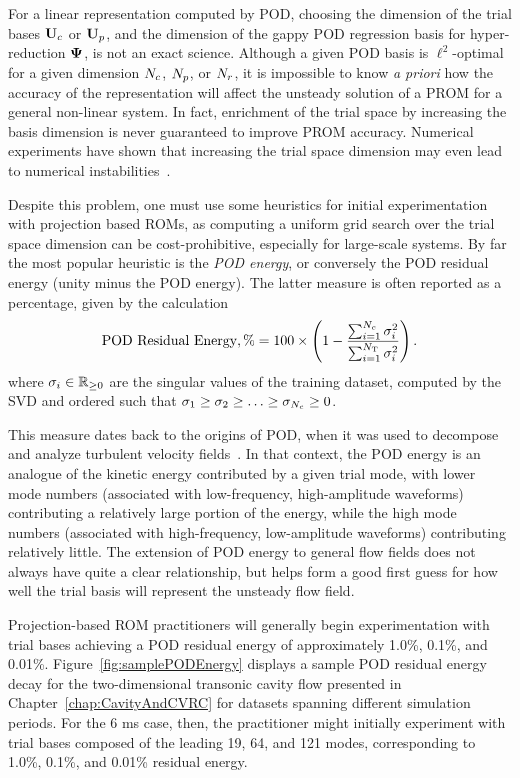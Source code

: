 For a linear representation computed by POD, choosing the dimension of the trial bases $\consTrial$ or $\primTrial$, and the dimension of the gappy POD regression basis for hyper-reduction $\deimBasis$, is not an exact science. Although a given POD basis is $\ell^2$-optimal for a given dimension $N_c$, $N_p$, or $N_r$, it is impossible to know \textit{a priori} how the accuracy of the representation will affect the unsteady solution of a PROM for a general non-linear system. In fact, enrichment of the trial space by increasing the basis dimension is never guaranteed to improve PROM accuracy. Numerical experiments have shown that increasing the trial space dimension may even lead to numerical instabilities~\cite{Huang2022}.

Despite this problem, one must use some heuristics for initial experimentation with projection based ROMs, as computing a uniform grid search over the trial space dimension can be cost-prohibitive, especially for large-scale systems. By far the most popular heuristic is the \textit{POD energy}, or conversely the POD residual energy (unity minus the POD energy). The latter measure is often reported as a percentage, given by the calculation
%
\begin{equation}\label{eq:podEnergyResidual}
    \text{POD Residual Energy}, \% = 100 \times \left( 1 - \frac{\sum_{i=1}^{N_c} \sigma_{i}^2}{\sum_{i=1}^{N_{\text{T}}} \sigma_{i}^2} \right).
\end{equation}
%
where $\sigma_{i} \in \mathbb{R}_{\ge 0}$ are the singular values of the training dataset, computed by the SVD and ordered such that $\sigma_1 \ge \sigma_2 \ge \hdots \ge \sigma_{N_c} \ge 0$.

This measure dates back to the origins of POD, when it was used to decompose and analyze turbulent velocity fields~\cite{berkoozPOD}.
In that context, the POD energy is an analogue of the kinetic energy contributed by a given trial mode, with lower mode numbers (associated with low-frequency, high-amplitude waveforms) contributing a relatively large portion of the energy, while the high mode numbers (associated with high-frequency, low-amplitude waveforms) contributing relatively little. The extension of POD energy to general flow fields does not always have quite a clear relationship, but helps form a good first guess for how well the trial basis will represent the unsteady flow field.

Projection-based ROM practitioners will generally begin experimentation with trial bases achieving a POD residual energy of approximately 1.0\%, 0.1\%, and 0.01\%. Figure~\ref{fig:samplePODEnergy} displays a sample POD residual energy decay for the two-dimensional transonic cavity flow presented in Chapter~\ref{chap:CavityAndCVRC} for datasets spanning different simulation periods. For the 6 ms case, then, the practitioner might initially experiment with trial bases composed of the leading 19, 64, and 121 modes, corresponding to 1.0\%, 0.1\%, and 0.01\% residual energy.

